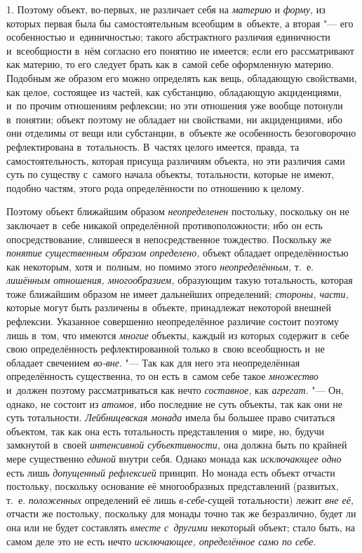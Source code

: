 1. Поэтому объект, во-первых, не различает себя на {\em материю} и
{\em форму,} из которых первая была бы самостоятельным всеобщим в~объекте,
а вторая "--- его особенностью и~единичностью; такого абстрактного
различия единичности и~всеобщности в~нём согласно его понятию не имеется;
если его рассматривают как материю, то его следует брать как в~самой себе
оформленную материю. Подобным же образом его можно определять как вещь,
обладающую свойствами, как целое, состоящее из частей, как субстанцию,
обладающую акциденциями, и~по прочим отношениям рефлексии; но эти отношения
уже вообще потонули в~понятии; объект поэтому не обладает ни свойствами, ни
акциденциями, ибо они отделимы от вещи или субстанции, в~объекте же
особенность безоговорочно рефлектирована в~тотальность. В~частях целого
имеется, правда, та самостоятельность, которая присуща различиям объекта,
но эти различия сами суть по существу с~самого начала объекты, тотальности,
которые не имеют, подобно частям, этого рода определённости по отношению к
целому.

Поэтому объект ближайшим образом {\em неопределенен}
постольку, поскольку он не заключает в~себе никакой
определённой противоположности; ибо он есть опосредствование, слившееся в
непосредственное тождество. Поскольку же {\em понятие существенным образом
определено,} объект обладает определённостью как некоторым,
хотя и~полным, но помимо этого {\em неопределённым,}
т.~е. {\em лишённым отношения, многообразием,} образующим такую тотальность,
которая тоже ближайшим образом не имеет дальнейших определений;
{\em стороны, части,}
которые могут быть различены в~объекте, принадлежат некоторой
внешней рефлексии. Указанное совершенно неопределённое различие состоит
поэтому лишь в~том, что имеются {\em многие} объекты,
каждый из которых содержит в~себе свою определённость рефлектированной
только в~свою всеобщность и~не обладает свечением {\em во-вне}. "--- Так как
для него эта неопределённая определённость существенна, то он есть в~самом
себе такое {\em множество} и~должен поэтому рассматриваться как нечто
{\em составное,} как {\em агрегат}. "--- Он,
однако, не состоит из {\em атомов,}
ибо последние не суть объекты, так как они не суть
тотальности. {\em Лейбницевская монада}
имела бы большее право считаться объектом, так как она есть
тотальность представления о~мире, но, будучи замкнутой в~своей
{\em интенсивной субъективности,} она должна быть по крайней мере существенно
{\em единой} внутри себя. Однако монада как {\em исключающее
одно} есть лишь {\em допущенный рефлексией}
принцип. Но монада есть объект отчасти постольку, поскольку
основание её многообразных представлений (развитых, т.~е.
{\em положенных} определений её лишь {\em в-себе}-сущей
тотальности) лежит {\em вне её,}
отчасти же постольку, поскольку для монады точно так же
безразлично, будет ли она или не будет составлять {\em вместе с~другими}
некоторый объект; стало быть, на самом деле это не есть нечто
{\em исключающее, определённое само по себе}.

